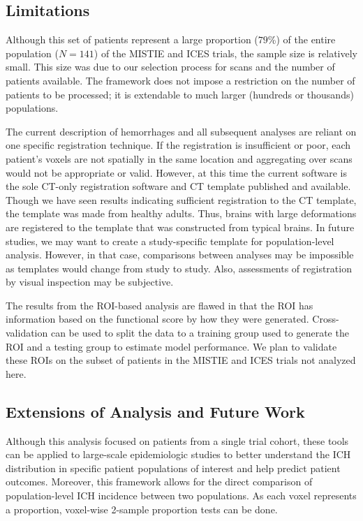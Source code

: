 \documentclass[10pt]{article}\usepackage[]{graphicx}\usepackage[]{color}
\begin{document}
\subsection*{Limitations}

Although this set of patients represent a large proportion ($79$\%) of the entire population ($N=141$) of the MISTIE and ICES trials, the sample size is relatively small.  This size was due to our selection process for scans and the number of patients available.  The framework does not impose a restriction on the number of patients to be processed; it is extendable to much larger (hundreds or thousands) populations.

The current description of hemorrhages and all subsequent analyses are reliant on one specific registration technique.  If the registration is insufficient or poor, each patient's voxels are not spatially in the same location and aggregating over scans would not be appropriate or valid.  However, at this time the current software is the sole CT-only registration software and CT template published and available.  Though we have seen results indicating sufficient registration to the CT template, the template was made from healthy adults.  Thus, brains with large deformations are registered to the template that was constructed from typical brains. In future studies, we may want to create a study-specific template for population-level analysis.  However, in that case, comparisons between analyses may be impossible as templates would change from study to study.  Also, assessments of registration by visual inspection may be subjective.

The results from the ROI-based analysis are flawed in that the ROI has information based on the functional score by how they were generated.  Cross-validation can be used to split the data to a training group used to generate the ROI and a testing group to estimate model performance.  We plan to validate these ROIs on the subset of patients in the MISTIE and ICES trials not analyzed here.  

\subsection*{Extensions of Analysis and Future Work }
Although this analysis focused on patients from a single trial cohort, these tools can be applied to large-scale epidemiologic studies to better understand the ICH distribution in specific patient populations of interest and help predict patient outcomes.  Moreover, this framework allows for the direct comparison of population-level ICH incidence between two populations.  As each voxel represents a proportion, voxel-wise 2-sample proportion tests can be done.
\end{document}
